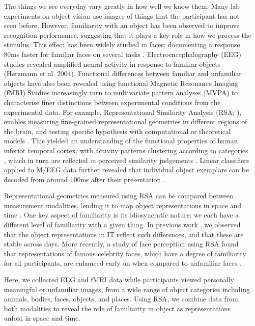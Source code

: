 \documentclass[10pt,letterpaper]{article}
\begin{document}
The things we see everyday vary greatly in how well we know them. 
Many lab experiments on object vision use images of things that 
the participant has not seen before. However, familiarity with 
an object has been observed to improve recognition performance, 
suggesting that it plays a key role in how we process the stimulus. 
This effect has been widely studied in faces; documenting a response 
80ms faster for familiar faces on several tasks 
\cite{Ramon2018-ou,Di_Oleggio_Castello2015-ij}. 
Electroencephalography (EEG) studies revealed  amplified neural 
activity in response to familiar objects (Herzmann et al. 2004). 
Functional differences between familiar and unfamiliar objects 
have also been revealed using functional Magnetic Resonance Imaging (fMRI)
\cite{Barense2011-td,McLelland2014-nw,Taylor2009-qu,Trinkler2009-zy} 
Studies increasingly turn to multivariate pattern analyses (MVPA) 
to characterise finer distinctions between experimental conditions 
from the experimental data. For example, Representational Similarity 
Analysis (RSA; \cite{Kriegeskorte2008-bp}), enables measuring fine-grained 
representational geometries in different regions of the brain, 
and testing specific hypothesis with computational or theoretical 
models \cite{Kriegeskorte2013-md}. This yielded an understanding 
of the functional properties of human inferior temporal cortex, 
with activity patterns clustering according to categories 
\cite{Haxby2001-kl,Kriegeskorte2008-bp}, which in turn are 
reflected in perceived similarity judgements \cite{Mur2013-ej}.  
Linear classifiers applied to M/EEG data further revealed that 
individual object exemplars can be decoded from around 100ms 
after their presentation \cite{Carlson2013-fw}. 

Representational geometries measured using RSA can be 
compared between measurement modalities, lending it to 
map object representations in space and time 
\cite{Cichy2014-bd,Cichy2016-tp}. One key aspect of 
familiarity is its idiosyncratic nature; we each have a 
different level of familiarity with a given thing. In previous work 
\cite{Charest2014-zn}, we observed that the object representations 
in IT reflect such differences, and that these are stable across days. 
More recently, a study of face perception using RSA found that 
representations of famous celebrity faces, which have a degree of 
familiarity for all participants, are enhanced early on when 
compared to unfamiliar faces \cite{Dobs2019-ov}. 

Here, we collected EEG and fMRI data while participants viewed 
personally meaningful or unfamiliar images, from a wide range 
of object categories including animals, bodies, faces, objects, 
and places. Using RSA, we combine data from both modalities to 
reveal the role of familiarity in object as representations 
unfold in space and time.
\end{document}
